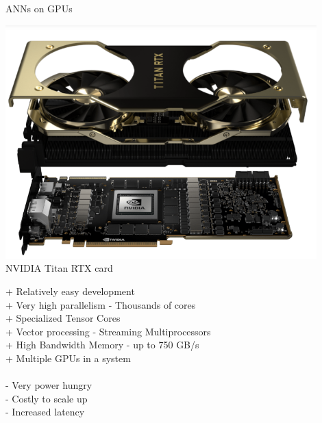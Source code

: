 \begin{frame}{ANNs on GPUs}
	\begin{minipage}{0.4\textwidth}
		\centering
		\includegraphics[width=0.9\textwidth]{../Images/Hardware/NVIDIA-Titan-RTX.png}\\
		NVIDIA Titan RTX card
	\end{minipage}%
	\begin{minipage}{0.6\textwidth}
		+ Relatively easy development\\
		+ Very high parallelism - Thousands of cores\\
		+ Specialized Tensor Cores\\
		+ Vector processing - Streaming Multiprocessors\\
		+ High Bandwidth Memory - up to 750 GB/s\\
		+ Multiple GPUs in a system\\\\
		- Very power hungry\\
		- Costly to scale up\\
		- Increased latency
	\end{minipage}
\end{frame}

